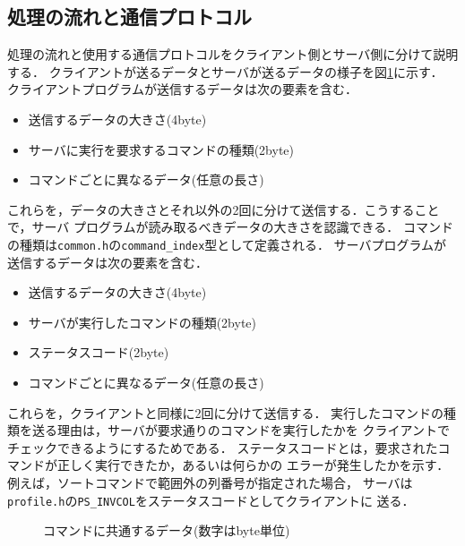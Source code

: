 \documentclass[a4j,10pt]{jarticle}
\begin{document}
\subsection{処理の流れと通信プロトコル}
処理の流れと使用する通信プロトコルをクライアント側とサーバ側に分けて説明する．
クライアントが送るデータとサーバが送るデータの様子を図\ref{fig:basic-data}に示す．
クライアントプログラムが送信するデータは次の要素を含む．
\begin{itemize}
\item 送信するデータの大きさ(4byte)
\item サーバに実行を要求するコマンドの種類(2byte)
\item コマンドごとに異なるデータ(任意の長さ)
\end{itemize}
これらを，データの大きさとそれ以外の2回に分けて送信する．こうすることで，サーバ
プログラムが読み取るべきデータの大きさを認識できる．
コマンドの種類は\verb|common.h|の\verb|command_index|型として定義される．
サーバプログラムが送信するデータは次の要素を含む．
\begin{itemize}
\item 送信するデータの大きさ(4byte)
\item サーバが実行したコマンドの種類(2byte)
\item ステータスコード(2byte)
\item コマンドごとに異なるデータ(任意の長さ)
\end{itemize}
これらを，クライアントと同様に2回に分けて送信する．
実行したコマンドの種類を送る理由は，サーバが要求通りのコマンドを実行したかを
クライアントでチェックできるようにするためである．
ステータスコードとは，要求されたコマンドが正しく実行できたか，あるいは何らかの
エラーが発生したかを示す．例えば，ソートコマンドで範囲外の列番号が指定された場合，
サーバは\verb|profile.h|の\verb|PS_INVCOL|をステータスコードとしてクライアントに
送る．
\begin{figure}
  \centering
  \par\bigskip
  \caption{コマンドに共通するデータ(数字はbyte単位)}
  \label{fig:basic-data}
\end{figure}
\end{document}
